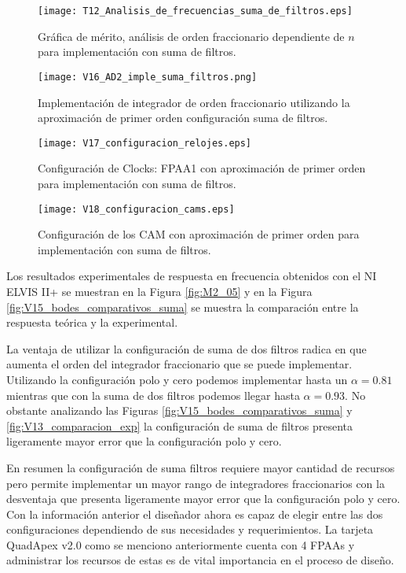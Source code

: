 	\begin{figure}[hbtp]
		\caption{Gráfica de mérito, análisis de orden fraccionario dependiente de $n$ para implementación con suma de filtros.} 
		\label{fig:T12_Analisis_de_frecuencias_suma_de_filtros}
		\centering
		\texttt{[image: T12\_Analisis\_de\_frecuencias\_suma\_de\_filtros.eps]}
	\end{figure}
	
	\begin{figure}[!ht] 
		\caption{Implementación de integrador de orden fraccionario utilizando la aproximación de primer orden configuración suma de filtros.}
		\label{fig:V16_AD2_imple_suma_filtros}
		\centering
		\texttt{[image: V16\_AD2\_imple\_suma\_filtros.png]}
	\end{figure}
	
	\begin{figure}[!ht] 
		\caption{Configuración de Clocks: FPAA1 con aproximación de primer orden para implementación con suma de filtros.}
		\label{fig:V17_configuracion_relojes}
		\centering
		\texttt{[image: V17\_configuracion\_relojes.eps]}
	\end{figure}
	
	\begin{figure}[!ht] 
		\caption{Configuración de los CAM con aproximación de primer orden para implementación con suma de filtros.}
		\label{fig:V18_configuracion_cams}
		\centering
		\texttt{[image: V18\_configuracion\_cams.eps]}
	\end{figure}
	
	Los resultados experimentales de respuesta en frecuencia obtenidos con el NI ELVIS II+ se muestran en la Figura \ref{fig:M2_05} y en la Figura \ref{fig:V15_bodes_comparativos_suma} se muestra la comparación entre la respuesta teórica y la experimental.
	
	La ventaja de utilizar la configuración de suma de dos filtros radica en que aumenta el orden del integrador fraccionario que se puede implementar. Utilizando la configuración polo y cero podemos implementar hasta un $\alpha = 0.81$  mientras que con la suma de dos filtros podemos llegar hasta $\alpha = 0.93$. No obstante analizando las Figuras \ref{fig:V15_bodes_comparativos_suma} y \ref{fig:V13_comparacion_exp} la configuración de suma de filtros presenta ligeramente mayor error que la configuración polo y cero. 
	
	En resumen la configuración de suma filtros requiere mayor cantidad de recursos pero permite implementar un mayor rango de integradores fraccionarios con la desventaja que presenta ligeramente mayor error que la configuración polo y cero. Con la información anterior el diseñador ahora es capaz de elegir entre las dos configuraciones dependiendo de sus necesidades y requerimientos. La tarjeta QuadApex v2.0 como se menciono anteriormente cuenta con 4 FPAAs y administrar los recursos de estas es de vital importancia en el proceso de diseño.
	
